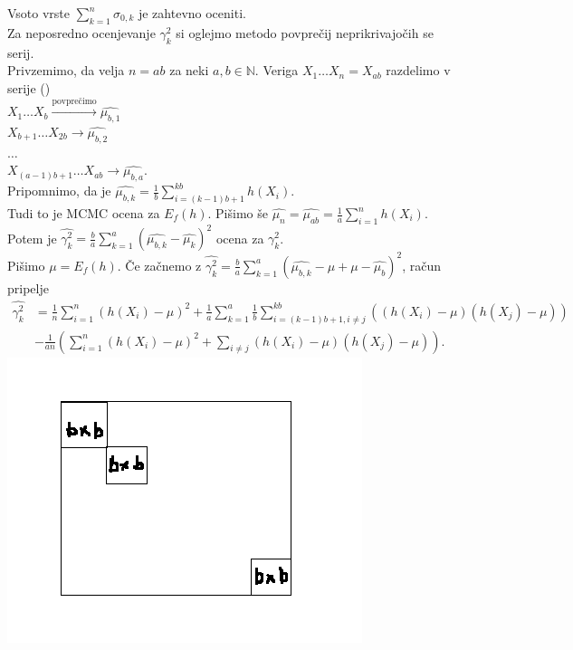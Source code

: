 \documentclass[a4paper, 12pt]{book}
\theoremstyle{definition}
\theoremstyle{remark}
\newcommand{\N}{\mathbb{N}}
\begin{document}
Vsoto vrste $\sum_{k=1}^{n} \sigma_{0,k}$ je zahtevno oceniti. \\
Za neposredno ocenjevanje $\gamma_k^2$ si oglejmo metodo povprečij neprikrivajočih se serij. \\
Privzemimo, da velja $n = ab$ za neki $a, b \in \N$.
Veriga $X_1 \dots X_n = X_{ab}$ razdelimo v serije () \\
$X_1 \dots X_b \stackrel{\text{povprečimo}}{\longrightarrow} \widehat{\mu_{b,1}}$ \\
$X_{b+1} \dots X_{2b} \longrightarrow \widehat{\mu_{b,2}}$ \\
$\dots$ \\
$X_{(a-1)b+1} \dots X_{ab} \longrightarrow \widehat{\mu_{b,a}}$. \\
Pripomnimo, da je $\widehat{\mu_{b,k}} = \frac{1}{b} \sum_{i=(k-1)b + 1}^{kb} h(X_i)$. \\
Tudi to je MCMC ocena za $E_f(h)$.
Pišimo še $\widehat{\mu_n} = \widehat{\mu_{ab}} = \frac{1}{a} \sum_{i=1}^{n} h(X_i)$. \\
Potem je $\widehat{\gamma_k^2} = \frac{b}{a} \sum_{k=1}^{a} (\widehat{\mu_{b,k}} - \widehat{\mu_k})^2$ ocena za $\gamma_k^2$. \\
Pišimo $\mu = E_f(h)$.
Če začnemo z $\widehat{\gamma_k^2} = \frac{b}{a} \sum_{k=1}^{a} (\widehat{\mu_{b,k}} - \mu + \mu -\widehat{\mu_b})^2$,
račun pripelje
\begin{align*}
  \widehat{\gamma_k^2} &= \frac{1}{n} \sum_{i=1}^{n} (h(X_i) - \mu)^2 +
    \frac{1}{a} \sum_{k=1}^{a} \frac{1}{b} \sum_{i=(k-1)b+1, i \neq j}^{kb} ((h(X_i) - \mu) (h(X_j) - \mu)) \\
    &- \frac{1}{an} \left(\sum_{i=1}^{n} (h(X_i) - \mu)^2 + \sum_{i \neq j} (h(X_i) - \mu)(h(X_j) - \mu)\right).
\end{align*}
\includegraphics[scale=0.5]{bloki_3_5} \\
\end{document}
